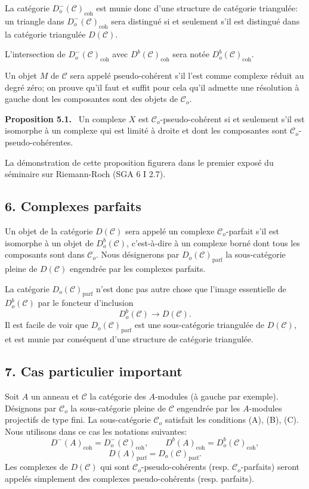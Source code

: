 \documentclass[11pt]{article}
\newenvironment{statement}[1]{\par\medskip\noindent\textbf{#1.}\ }{\par\medskip}
\providecommand{\parf}{\mathrm{parf}}
\providecommand{\coh}{\mathrm{coh}}
\providecommand{\cC}{\mathcal C}
\providecommand{\cC}{\mathcal C}
\providecommand{\parf}{\mathrm{parf}}
\providecommand{\coh}{\mathrm{coh}}
\begin{document}
La catégorie $D_o^-(\cC)_{\coh}$ est munie donc d'une structure de catégorie triangulée: un triangle dans $D_o^-(\cC)_{\coh}$ sera distingué si et seulement s'il est distingué dans la catégorie triangulée $D(\cC)$.

L'intersection de $D_o^-(\cC)_{\coh}$ avec $D^b(\cC)_{\coh}$ sera notée $D_o^b(\cC)_{\coh}$.

Un objet $M$ de $\cC$ sera appelé pseudo-cohérent s'il l'est comme complexe réduit au degré zéro; on prouve qu'il faut et suffit pour cela qu'il admette une résolution à gauche dont les composantes sont des objets de $\cC_o$.

\begin{statement}{Proposition 5.1}
Un complexe $X$ est $\cC_o$-pseudo-cohérent si et seulement s'il est isomorphe à un complexe qui est limité à droite et dont les composantes sont $\cC_o$-pseudo-cohérentes.
\end{statement}

La démonstration de cette proposition figurera dans le premier exposé du séminaire sur Riemann-Roch (SGA 6 I 2.7).

\subsection*{6. Complexes parfaits}

Un objet de la catégorie $D(\cC)$ sera appelé un complexe $\cC_o$-parfait s'il est isomorphe à un objet de $D_o^b(\cC)$, c'est-à-dire à un complexe borné dont tous les composants sont dans $\cC_o$. Nous désignerons par $D_o(\cC)_{\parf}$ la sous-catégorie pleine de $D(\cC)$ engendrée par les complexes parfaits.

La catégorie $D_o(\cC)_{\parf}$ n'est donc pas autre chose que l'image essentielle de $D_o^b(\cC)$ par le foncteur d'inclusion
\[
D_o^b(\cC)\longrightarrow D(\cC).
\]
Il est facile de voir que $D_o(\cC)_{\parf}$ est une sous-catégorie triangulée de $D(\cC)$, et est munie par conséquent d'une structure de catégorie triangulée.

\subsection*{7. Cas particulier important}

Soit $A$ un anneau et $\cC$ la catégorie des $A$-modules (à gauche par exemple). Désignons par $\cC_o$ la sous-catégorie pleine de $\cC$ engendrée par les $A$-modules projectifs de type fini. La sous-catégorie $\cC_o$ satisfait les conditions (A), (B), (C). Nous utilisons dans ce cas les notations suivantes:
\[
D^-(A)_{\coh}=D_o^-(\cC)_{\coh},\qquad
D^b(A)_{\coh}=D_o^b(\cC)_{\coh},
\]
\[
D(A)_{\parf}=D_o(\cC)_{\parf}.
\]
Les complexes de $D(\cC)$ qui sont $\cC_o$-pseudo-cohérents (resp. $\cC_o$-parfaits) seront appelés simplement des complexes pseudo-cohérents (resp. parfaits).
\end{document}
